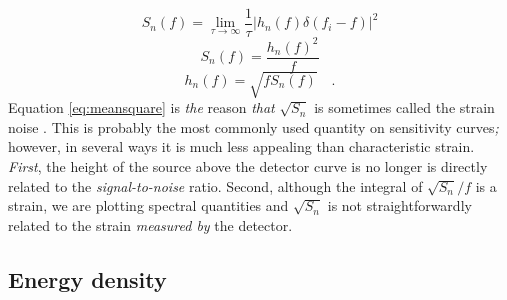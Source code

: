 \begin{equation} S_{n}(f)=\lim_{\tau \rightarrow \infty}\frac{1}{\tau}\left| h_{n}(f)\delta (f_{i}-f) \right|^{2} \end{equation}
\begin{equation} S_{n}(f)=\frac{h_{n}(f)^{2}}{f} \end{equation}
\begin{equation} h_{n}(f)=\sqrt{fS_{n}(f)} \quad . \end{equation}
Equation \ref{eq:meansquare} is \emph{the} reason \emph{that} $\sqrt{S_{n}}$ is sometimes called the strain noise \citep{Phinney}. This is probably the most commonly used quantity on sensitivity curves\emph{;} however, in several ways it is much less appealing than characteristic strain. \emph{First}, the height of the source above the detector curve is no longer is directly related to the \emph{signal-to-noise} ratio. Second, although the integral of $\sqrt{S_{n}}/f$ is a strain, we are plotting spectral quantities and $\sqrt{S_{n}}$ is not straightforwardly related to the strain \emph{measured by} the detector.

\subsection{Energy density}

